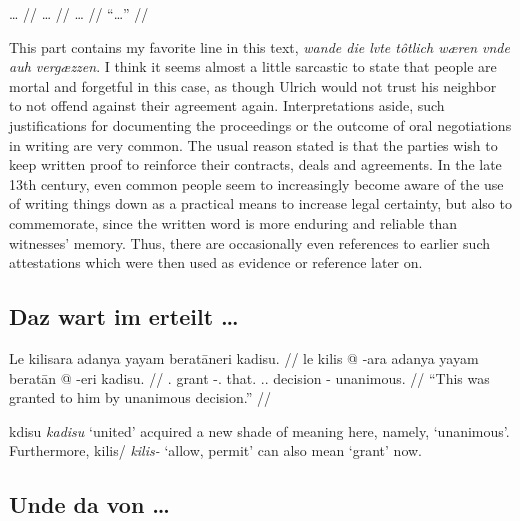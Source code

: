 \documentclass[12pt,paper=a4]{scrartcl}
\newcommand{\fw}[1]{\textit{#1}} %
\newcommand{\xayr}[3]{{\Tagati #1} \emph{#2} \enquote*{#3}}
\begin{document}

\ex \begingl
	\glpreamble … //
	\gla … //
	\glb … //
	\glft \enquote{…} //
\endgl \xe

This part contains my favorite line in this text, \fw{wande die lvte tôtlich 
wæren vnde auh vergæzzen}. I think it seems almost a little sarcastic to state 
that people are mortal and forgetful in this case, as though Ulrich would not 
trust his neighbor to not offend against their agreement again. Interpretations 
aside, such justifications for documenting the proceedings or the outcome of 
oral negotiations in writing are very common. The usual reason stated is that 
the parties wish to keep written proof to reinforce their contracts, deals and 
agreements. In the late 13th century, even common people seem to increasingly 
become aware of the use of writing things down as a practical means to increase 
legal certainty, but also to commemorate, since the written word is more 
enduring and reliable than witnesses' memory. Thus, there are occasionally even 
references to earlier such attestations which were then used as evidence or 
reference later on.

\subsection*{Daz wart im erteilt …}


\ex \begingl
	\glpreamble Le kilisara adanya yayam beratāneri kadisu. //
	\gla le kilis @ -ara adanya yayam beratān @ -eri kadisu. //
	\glb \PatT{}.\Inan{} grant -\Tsg{}.\Inan{} that.\Top{} 
		\Tsg{}.\M{}.\Dat{} decision -\Ins{} unanimous. //
	\glft \enquote{This was granted to him by unanimous decision.} //
\endgl \xe

\xayr{kdisu}{kadisu}{united} acquired a new shade of meaning here, namely, 
`unanimous'. Furthermore, \xayr{kilis/}{kilis-}{allow, permit} can also mean 
`grant' now.

\subsection*{Unde da von …}

\end{document}
